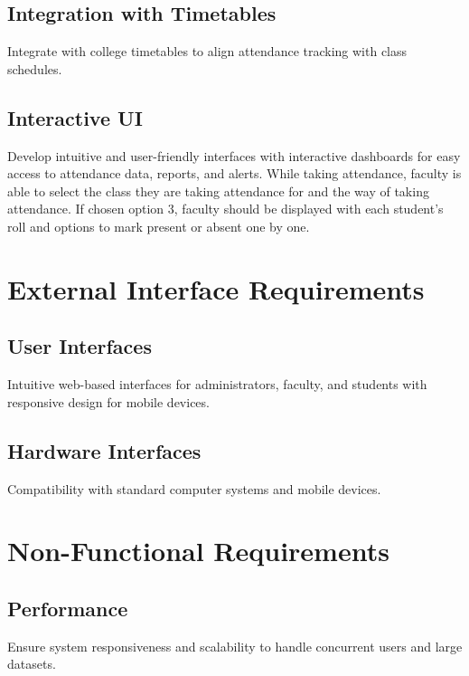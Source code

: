 \documentclass{article}
\begin{document}
\subsection*{\Large{Integration with Timetables}}
\begin{large}
Integrate with college timetables to align attendance tracking with class schedules.
\end{large}

\subsection*{\Large{Interactive UI}}
\begin{large}
Develop intuitive and user-friendly interfaces with interactive dashboards for easy access to attendance data, reports, and alerts. While taking attendance, faculty is able to select the class they are taking attendance for and the way of taking attendance. If chosen option 3, faculty should be displayed with each student's roll and options to mark present or absent one by one.
\end{large}

\section*{\huge{External Interface Requirements}}

\subsection*{\Large{User Interfaces}}
\begin{large}
Intuitive web-based interfaces for administrators, faculty, and students with responsive design for mobile devices.
\end{large}

\subsection*{\Large{Hardware Interfaces}}
\begin{large}
Compatibility with standard computer systems and mobile devices.
\end{large}

\section*{\huge{Non-Functional Requirements}}

\subsection*{\Large{Performance}}
\begin{large}
Ensure system responsiveness and scalability to handle concurrent users and large datasets.
\end{large}
\end{document}
